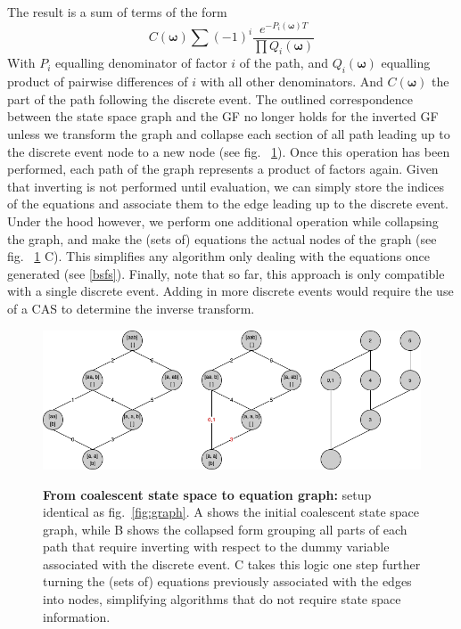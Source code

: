 \documentclass[10pt, a4]{article}
\begin{document}
The result is a sum of terms of the form 
\begin{equation}\label{eq:inverted_eq}
C(\boldsymbol\omega)\sum(-1)^{i}\frac{e^{-P_i(\boldsymbol\omega)T}}{\prod Q_i(\boldsymbol\omega)}
\end{equation}
With $P_i$ equalling denominator of factor $i$ of the path, and $Q_i(\boldsymbol\omega)$ equalling product of pairwise differences of $i$ with all other denominators. And $C(\boldsymbol\omega)$ the part of the path following the discrete event. The outlined correspondence between the state space graph and the GF no longer holds for the inverted GF unless we transform the graph and collapse each section of all path leading up to the discrete event node to a new node (see fig. \ \ref{fig:equation_graph}). Once this operation has been performed, each path of the graph represents a product of factors again. Given that inverting is not performed until evaluation, we can simply store the indices of the equations and associate them to the edge leading up to the discrete event. Under the hood however, we perform one additional operation while collapsing the graph, and make the (sets of) equations the actual nodes of the graph (see fig. \ \ref{fig:equation_graph} C). This simplifies any algorithm only dealing with the equations once generated (see \ref{bsfs}). Finally, note that so far, this approach is only compatible with a single discrete event. Adding in more discrete events would require the use of a CAS to determine the inverse transform.

\begin{figure}
\begin{center}
\includegraphics[scale=0.5]{figures/temp3.png}\label{fig:equation_graph}
\end{center}
\caption{\textbf{From coalescent state space to equation graph:} setup identical as fig.\ \ref{fig:graph}. A shows the initial coalescent state space graph, while B shows the collapsed form grouping all parts of each path that require inverting with respect to the dummy variable associated with the discrete event. C takes this logic one step further turning the (sets of) equations previously associated with the edges into nodes, simplifying algorithms that do not require state space information.}
\end{figure}
\end{document}
